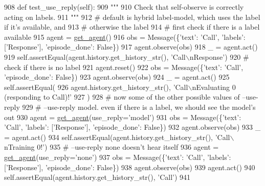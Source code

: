 \begin{DoxyCode}
908     \textcolor{keyword}{def }test\_use\_reply(self):
909         \textcolor{stringliteral}{"""}
910 \textcolor{stringliteral}{        Check that self-observe is correctly acting on labels.}
911 \textcolor{stringliteral}{        """}
912         \textcolor{comment}{# default is hybrid label-model, which uses the label if it's available, and}
913         \textcolor{comment}{# otherwise the label}
914         \textcolor{comment}{# first check if there is a label available}
915         agent = \hyperlink{namespacetests_1_1test__torch__agent_ae929d109305aaea29fbfa13ecf1f32e9}{get\_agent}()
916         obs = Message(\{\textcolor{stringliteral}{'text'}: \textcolor{stringliteral}{'Call'}, \textcolor{stringliteral}{'labels'}: [\textcolor{stringliteral}{'Response'}], \textcolor{stringliteral}{'episode\_done'}: \textcolor{keyword}{False}\})
917         agent.observe(obs)
918         \_ = agent.act()
919         self.assertEqual(agent.history.get\_history\_str(), \textcolor{stringliteral}{'Call\(\backslash\)nResponse'})
920         \textcolor{comment}{# check if there is no label}
921         agent.reset()
922         obs = Message(\{\textcolor{stringliteral}{'text'}: \textcolor{stringliteral}{'Call'}, \textcolor{stringliteral}{'episode\_done'}: \textcolor{keyword}{False}\})
923         agent.observe(obs)
924         \_ = agent.act()
925         self.assertEqual(
926             agent.history.get\_history\_str(), \textcolor{stringliteral}{'Call\(\backslash\)nEvaluating 0 (responding to Call)!'}
927         )
928         \textcolor{comment}{# now some of the other possible values of --use-reply}
929         \textcolor{comment}{# --use-reply model. even if there is a label, we should see the model's out}
930         agent = \hyperlink{namespacetests_1_1test__torch__agent_ae929d109305aaea29fbfa13ecf1f32e9}{get\_agent}(use\_reply=\textcolor{stringliteral}{'model'})
931         obs = Message(\{\textcolor{stringliteral}{'text'}: \textcolor{stringliteral}{'Call'}, \textcolor{stringliteral}{'labels'}: [\textcolor{stringliteral}{'Response'}], \textcolor{stringliteral}{'episode\_done'}: \textcolor{keyword}{False}\})
932         agent.observe(obs)
933         \_ = agent.act()
934         self.assertEqual(agent.history.get\_history\_str(), \textcolor{stringliteral}{'Call\(\backslash\)nTraining 0!'})
935         \textcolor{comment}{# --use-reply none doesn't hear itself}
936         agent = \hyperlink{namespacetests_1_1test__torch__agent_ae929d109305aaea29fbfa13ecf1f32e9}{get\_agent}(use\_reply=\textcolor{stringliteral}{'none'})
937         obs = Message(\{\textcolor{stringliteral}{'text'}: \textcolor{stringliteral}{'Call'}, \textcolor{stringliteral}{'labels'}: [\textcolor{stringliteral}{'Response'}], \textcolor{stringliteral}{'episode\_done'}: \textcolor{keyword}{False}\})
938         agent.observe(obs)
939         agent.act()
940         self.assertEqual(agent.history.get\_history\_str(), \textcolor{stringliteral}{'Call'})
941 
\end{DoxyCode}
